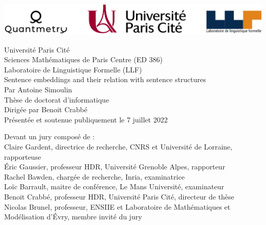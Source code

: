 \begin{titlepage}
\begin{center}
    {
    
    \includegraphics[width=14cm]{images/logos_3.png}
        
    \huge
    Université Paris Cité\\
    \large 
    Sciences Mathématiques de Paris Centre (ED 386)\\
    Laboratoire de Linguistique Formelle (LLF)\\[30pt]
    
    \Huge
    Sentence embeddings and their relation with sentence structures\\[56pt]
    
    \LARGE 
    \textmd{Par Antoine Simoulin\\[44pt]
    \Large
    Thèse de doctorat d’informatique\\[20pt]
    Dirigée par Benoit Crabbé \\[20pt]
    \large 
    Présentée et soutenue publiquement le 7 juillet 2022\\[20pt]}
    
    \vspace*{\fill}
    \raggedright\large 
    \textmd{Devant un jury composé de : \\[12pt]
    \normalsize
    Claire Gardent, directrice de recherche, CNRS et Université de Lorraine, rapporteuse\\
    Éric Gaussier, professeur HDR, Université Grenoble Alpes, rapporteur\\
    Rachel Bawden, chargée de recherche, Inria, examinatrice\\
    Loïc Barrault, maitre de conférence, Le Mans Université, examinateur\\
    Benoit Crabbé, professeur HDR, Université Paris Cité, directeur de thèse\\
    Nicolas Brunel, professeur, ENSIIE et Laboratoire de Mathématiques et Modélisation d'Évry, membre invité du jury\\}
}
\end{center}
\end{titlepage}
